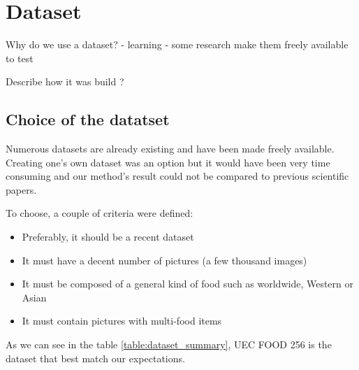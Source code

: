 \chapter{Dataset}  \label{sec:dataset}

Why do we use a dataset?
- learning
- some research make them freely available to test

Describe how it was build ?

\section{Choice of the datatset}

Numerous datasets are already existing and have been made freely available. Creating one's own dataset was an option but it would have been very time consuming and our method's result could not be compared to previous scientific papers.

To choose, a couple of criteria were defined:
\begin{itemize}
    \item Preferably, it should be a recent dataset
    \item It must have a decent number of pictures (a few thousand images)
    \item It must be composed of a general kind of food such as worldwide, Western or Asian
    \item It must contain pictures with multi-food items
\end{itemize}

As we can see in the table \ref{table:dataset_summary}, UEC FOOD 256 is the dataset that best match our expectations.

